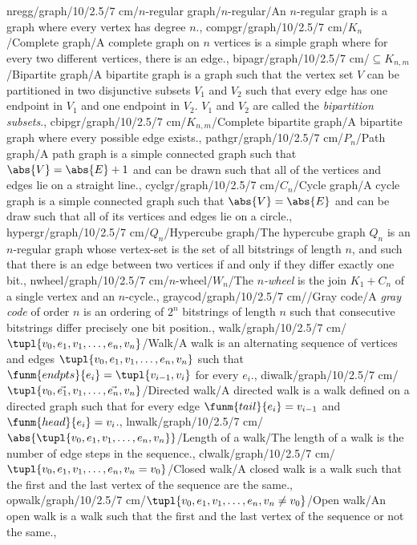 nregg/graph/10/2.5/7 cm/{$n$-regular graph}/{$n$-regular}/{An $n$-regular graph is a graph where every vertex has degree $n$.},%
compgr/graph/10/2.5/7 cm/{$K_n$}/{Complete graph}/{A complete graph on $n$ vertices is a simple graph where for every two different vertices, there is an edge.},%
bipagr/graph/10/2.5/7 cm/{$\subseteq K_{n,m}$}/{Bipartite graph}/{A bipartite graph is a graph such that the vertex set $V$ can be partitioned in two disjunctive subsets $V_1$ and $V_2$ such that every edge has one endpoint in $V_1$ and one endpoint in $V_2$. $V_1$ and $V_2$ are called the \emph{bipartition subsets}.},%
cbipgr/graph/10/2.5/7 cm/{$K_{n,m}$}/{Complete bipartite graph}/{A bipartite graph where every possible edge exists.},%
pathgr/graph/10/2.5/7 cm/{$P_n$}/{Path graph}/{A path graph is a simple connected graph such that $\abs{V}=\abs{E}+1$ and can be drawn such that all of the vertices and edges lie on a straight line.},%
cyclgr/graph/10/2.5/7 cm/{$C_n$}/{Cycle graph}/{A cycle graph is a simple connected graph such that $\abs{V}=\abs{E}$ and can be draw such that all of its vertices and edges lie on a circle.},%
hypergr/graph/10/2.5/7 cm/{$Q_n$}/{Hypercube graph}/{The hypercube graph $Q_n$ is an $n$-regular graph whose vertex-set is the set of all bitstrings of length $n$, and such that there is an edge between two vertices if and only if they differ exactly one bit.},%
nwheel/graph/10/2.5/7 cm/{$n$-wheel}/{$W_n$}/{The \emph{$n$-wheel} is the join $K_1+C_n$ of a single vertex and an $n$-cycle.},%
graycod/graph/10/2.5/7 cm/{}/{Gray code}/{A \emph{gray code} of order $n$ is an ordering of $2^n$ bitstrings of length $n$ such that consecutive bitstrings differ precisely one bit position.},
walk/graph/10/2.5/7 cm/{$\tupl{v_0,e_1,v_1,\ldots,e_n,v_n}$}/{Walk}/{A walk is an alternating sequence of vertices and edges $\tupl{v_0,e_1,v_1,\ldots,e_n,v_n}$ such that $\funm{endpts}{e_i}=\tupl{v_{i-1},v_i}$ for every $e_i$.},
diwalk/graph/10/2.5/7 cm/{$\tupl{v_0,\vec{e_1},v_1,\ldots,\vec{e_n},v_n}$}/{Directed walk}/{A directed walk is a walk defined on a directed graph such that for every edge $\funm{tail}{e_i}=v_{i-1}$ and $\funm{head}{e_i}=v_i$.},
lnwalk/graph/10/2.5/7 cm/{$\abs{\tupl{v_0,e_1,v_1,\ldots,e_n,v_n}}$}/{Length of a walk}/{The length of a walk is the number of edge steps in the sequence.},
clwalk/graph/10/2.5/7 cm/{$\tupl{v_0,e_1,v_1,\ldots,e_n,v_n=v_0}$}/{Closed walk}/{A closed walk is a walk such that the first and the last vertex of the sequence are the same.},
opwalk/graph/10/2.5/7 cm/{$\tupl{v_0,e_1,v_1,\ldots,e_n,v_n\neq v_0}$}/{Open walk}/{An open walk is a walk such that the first and the last vertex of the sequence or not the same.},
